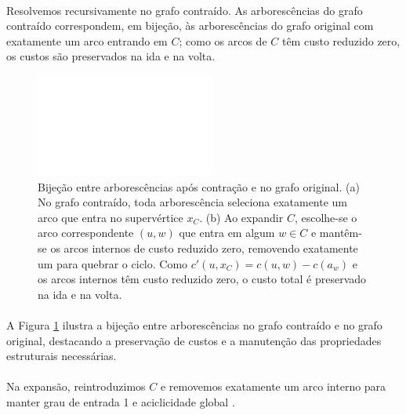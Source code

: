 \documentclass[12pt,a4paper]{article}
\begin{document}
\paragraph{}
Resolvemos recursivamente no grafo contraído. As arborescências do grafo contraído correspondem, em bijeção, às arborescências do grafo original com exatamente um arco entrando em \(C\); como os arcos de \(C\) têm custo reduzido zero, os custos são preservados na ida e na volta. 


\begin{figure}[H]
    \centering
    \includegraphics[width=0.9\linewidth]{figures/fig_chu_liu_bijection.pdf}

    \caption{Bijeção entre arborescências após contração e no grafo original. (a) No grafo contraído, toda arborescência seleciona exatamente um arco que entra no supervértice $x_C$. (b) Ao expandir $C$, escolhe-se o arco correspondente \((u,w)\) que entra em algum $w\in C$ e mantêm-se os arcos internos de custo reduzido zero, removendo exatamente um para quebrar o ciclo. Como $c'(u,x_C)=c(u,w)-c(a_w)$ e os arcos internos têm custo reduzido zero, o custo total é preservado na ida e na volta.}
    \label{fig:chu-liu-bijection}\end{figure}


\paragraph{}
A Figura \ref{fig:chu-liu-bijection} ilustra a bijeção entre arborescências no grafo contraído e no grafo original, destacando a preservação de custos e a manutenção das propriedades estruturais necessárias.

\paragraph{}
Na expansão, reintroduzimos \(C\) e removemos exatamente um arco interno para manter grau de entrada 1 e aciclicidade global \cite{schrijver2003comb,kleinberg2006}.
\end{document}
